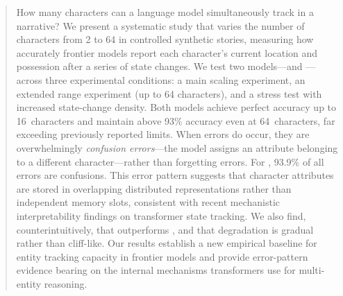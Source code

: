 \begin{abstract}
How many characters can a language model simultaneously track in a narrative?
We present a systematic study that varies the number of characters from 2 to 64 in controlled synthetic stories, measuring how accurately frontier models report each character's current location and possession after a series of state changes.
We test two models---\gptfull and \gptmini---across three experimental conditions: a main scaling experiment, an extended range experiment (up to 64 characters), and a stress test with increased state-change density.
Both models achieve perfect accuracy up to 16~characters and maintain above 93\% accuracy even at 64~characters, far exceeding previously reported limits.
When errors do occur, they are overwhelmingly \emph{confusion errors}---the model assigns an attribute belonging to a different character---rather than forgetting errors.
For \gptmini, 93.9\% of all errors are confusions.
This error pattern suggests that character attributes are stored in overlapping distributed representations rather than independent memory slots, consistent with recent mechanistic interpretability findings on transformer state tracking.
We also find, counterintuitively, that \gptmini outperforms \gptfull, and that degradation is gradual rather than cliff-like.
Our results establish a new empirical baseline for entity tracking capacity in frontier models and provide error-pattern evidence bearing on the internal mechanisms transformers use for multi-entity reasoning.
\end{abstract}
